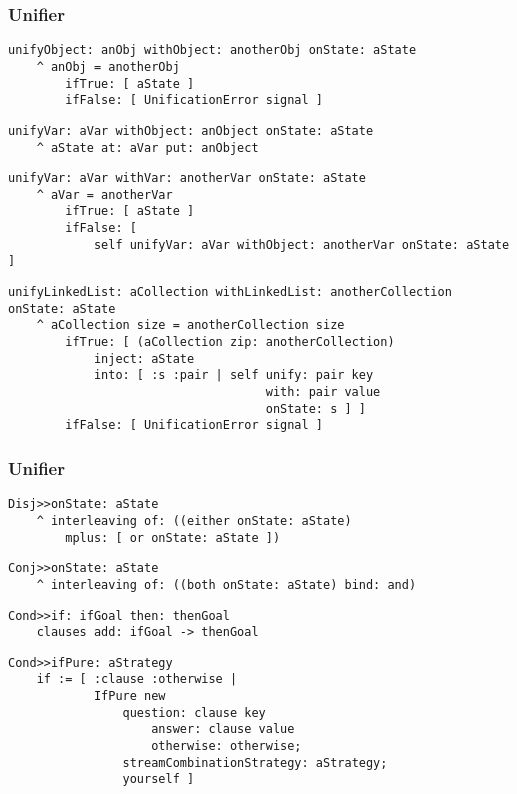 \documentclass{beamer}
\begin{document}
\begin{frame}[fragile]
\frametitle{Unifier}
\begin{verbatim}
unifyObject: anObj withObject: anotherObj onState: aState
    ^ anObj = anotherObj
        ifTrue: [ aState ]
        ifFalse: [ UnificationError signal ]
\end{verbatim}
\begin{verbatim}
unifyVar: aVar withObject: anObject onState: aState
    ^ aState at: aVar put: anObject
\end{verbatim}
\begin{verbatim}
unifyVar: aVar withVar: anotherVar onState: aState
    ^ aVar = anotherVar
        ifTrue: [ aState ]
        ifFalse: [ 
            self unifyVar: aVar withObject: anotherVar onState: aState ]
\end{verbatim}
\begin{verbatim}
unifyLinkedList: aCollection withLinkedList: anotherCollection onState: aState
    ^ aCollection size = anotherCollection size
        ifTrue: [ (aCollection zip: anotherCollection)
            inject: aState
            into: [ :s :pair | self unify: pair key 
                                    with: pair value 
                                    onState: s ] ]
        ifFalse: [ UnificationError signal ]
\end{verbatim}
\end{frame}


\begin{frame}[fragile]
\frametitle{Unifier}
\begin{verbatim}
Disj>>onState: aState
    ^ interleaving of: ((either onState: aState) 
        mplus: [ or onState: aState ])
\end{verbatim}
\begin{verbatim}
Conj>>onState: aState
    ^ interleaving of: ((both onState: aState) bind: and)
\end{verbatim}
\begin{verbatim}
Cond>>if: ifGoal then: thenGoal
    clauses add: ifGoal -> thenGoal
\end{verbatim}
\begin{verbatim}
Cond>>ifPure: aStrategy
    if := [ :clause :otherwise | 
            IfPure new
                question: clause key 
                    answer: clause value 
                    otherwise: otherwise;
                streamCombinationStrategy: aStrategy;
                yourself ]
\end{verbatim}
\end{frame}
\end{document}

